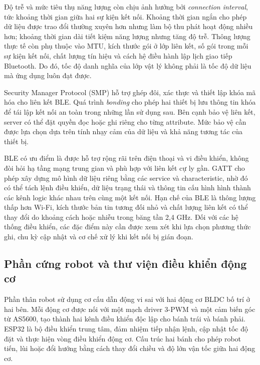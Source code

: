 Độ trễ và mức tiêu thụ năng lượng còn chịu ảnh hưởng bởi \textit{connection interval}, tức khoảng thời gian giữa hai sự kiện kết nối. Khoảng thời gian ngắn cho phép dữ liệu được trao đổi thường xuyên hơn nhưng làm bộ thu phát hoạt động nhiều hơn; khoảng thời gian dài tiết kiệm năng lượng nhưng tăng độ trễ. Thông lượng thực tế còn phụ thuộc vào MTU, kích thước gói ở lớp liên kết, số gói trong mỗi sự kiện kết nối, chất lượng tín hiệu và cách hệ điều hành lập lịch giao tiếp Bluetooth. Do đó, tốc độ danh nghĩa của lớp vật lý không phải là tốc độ dữ liệu mà ứng dụng luôn đạt được.

Security Manager Protocol (SMP) hỗ trợ ghép đôi, xác thực và thiết lập khóa mã hóa cho liên kết BLE. Quá trình \textit{bonding} cho phép hai thiết bị lưu thông tin khóa để tái lập kết nối an toàn trong những lần sử dụng sau. Bên cạnh bảo vệ liên kết, server có thể đặt quyền đọc hoặc ghi riêng cho từng attribute. Mức bảo vệ cần được lựa chọn dựa trên tính nhạy cảm của dữ liệu và khả năng tương tác của thiết bị.

BLE có ưu điểm là được hỗ trợ rộng rãi trên điện thoại và vi điều khiển, không đòi hỏi hạ tầng mạng trung gian và phù hợp với liên kết cự ly gần. GATT cho phép xây dựng mô hình dữ liệu riêng bằng các service và characteristic, nhờ đó có thể tách lệnh điều khiển, dữ liệu trạng thái và thông tin cấu hình hình thành các kênh logic khác nhau trên cùng một kết nối. Hạn chế của BLE là thông lượng thấp hơn Wi-Fi, kích thước bản tin tương đối nhỏ và chất lượng liên kết có thể thay đổi do khoảng cách hoặc nhiễu trong băng tần 2,4 GHz. Đối với các hệ thống điều khiển, các đặc điểm này cần được xem xét khi lựa chọn phương thức ghi, chu kỳ cập nhật và cơ chế xử lý khi kết nối bị gián đoạn.

\subsection{Phần cứng robot và thư viện điều khiển động cơ}

Phần thân robot sử dụng cơ cấu dẫn động vi sai với hai động cơ BLDC bố trí ở hai bên. Mỗi động cơ được nối với một mạch driver 3-PWM và một cảm biến góc từ AS5600, tạo thành hai kênh điều khiển độc lập cho bánh trái và bánh phải. ESP32 là bộ điều khiển trung tâm, đảm nhiệm tiếp nhận lệnh, cập nhật tốc độ đặt và thực hiện vòng điều khiển động cơ. Cấu trúc hai bánh cho phép robot tiến, lùi hoặc đổi hướng bằng cách thay đổi chiều và độ lớn vận tốc giữa hai động cơ.

